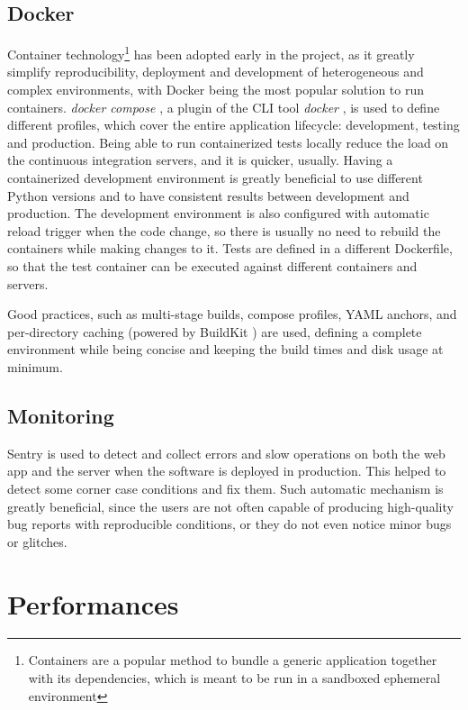 \documentclass{Configuration_Files/PoliMi3i_thesis}
\begin{document}
\subsection{Docker}

Container technology\footnote{Containers are a popular method to bundle a generic application together with its dependencies, which is meant to be run in a sandboxed ephemeral environment} has been adopted early in the project, as it greatly simplify reproducibility, deployment and development of heterogeneous and complex environments, with Docker \cite{HomeDocker2022} being the most popular solution to run containers. \textit{docker compose} \cite{DockerComposeV22022}, a plugin of the CLI tool \textit{docker} \cite{DockerCLI2022}, is used to define different profiles, which cover the entire application lifecycle: development, testing and production. Being able to run containerized tests locally reduce the load on the continuous integration servers, and it is quicker, usually. Having a containerized development environment is greatly beneficial to use different Python versions and to have consistent results between development and production. The development environment is also configured with automatic reload trigger when the code change, so there is usually no need to rebuild the containers while making changes to it. Tests are defined in a different Dockerfile, so that the test container can be executed against different containers and servers.

Good practices, such as multi-stage builds, compose profiles, YAML anchors, and per-directory caching (powered by BuildKit \cite{BuildKit2022}) are used, defining a complete environment while being concise and keeping the build times and disk usage at minimum.

\subsection{Monitoring}
\label{subsec:monitoring}

Sentry \cite{ApplicationMonitoringError} is used to detect and collect errors and slow operations on both the web app and the server when the software is deployed in production. This helped to detect some corner case conditions and fix them. Such automatic mechanism is greatly beneficial, since the users are not often capable of producing high-quality bug reports with reproducible conditions, or they do not even notice minor bugs or glitches.

\section{Performances}
\end{document}
